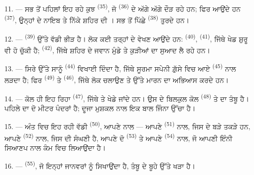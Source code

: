 11. --- ਸਭ ਤੋਂ ਪਹਿਲਾਂ ਇਹ ਰਹੇ ਕੁਝ  \textsuperscript{(35)}, ਜੋ
 \textsuperscript{(36)} ਦੇ ਅੱਗੇ ਅੱਗੇ ਦੌੜ ਰਹੇ ਹਨ; ਫਿਰ ਆਉਂਦੇ
ਹਨ  \textsuperscript{(37)}, ਉਨ੍ਹਾਂ ਦੇ ਨਾਇਬ ਤੇ ਨਿੱਕੇ ਸ਼ਹਿਰ ਦੀ
। ਸਭ ਤੋਂ ਪਿੱਛੇ  \textsuperscript{(38)}
ਤੁਰਦੇ ਹਨ।

\VUsaut{5.0mm}
\VUsaut{3.6mm}

12. ---  \textsuperscript{(39)} ਉੱਤੇ ਵੱਡੀ ਭੀੜ ਹੈ। ਲੋਕ ਕਈ
ਤਰ੍ਹਾਂ ਦੇ  ਵੇਖਣ ਆਉਂਦੇ ਹਨ: 
\textsuperscript{(40)},  \textsuperscript{(41)}, ਜਿੱਥੇ ਖੇਡ ਸ਼ੁਰੂ ਵੀ ਹੋ
ਚੁੱਕੀ ਹੈ;  \textsuperscript{(42)}, ਜਿੱਥੇ ਸ਼ਹਿਰ ਦੇ ਜਵਾਨ ਮੁੰਡੇ
ਤੇ ਕੁੜੀਆਂ  ਦਾ ਸੁਆਦ ਲੈ ਰਹੇ ਹਨ।

13. --- ਸਿਰੇ ਉੱਤੇ ਸਾਨੂੰ  \textsuperscript{(44)} ਵਿਖਾਈ ਦਿੰਦਾ ਹੈ,
ਜਿੱਥੇ ਸੂਰਮਾ ਸਪੇਨੀ  ਗ਼ੁੱਸੇ ਵਿਚ ਆਏ 
\textsuperscript{(45)} ਨਾਲ ਲੜਦਾ ਹੈ; ਫਿਰ  \textsuperscript{(49)}
ਤੇ  \textsuperscript{(46)}, ਜਿੱਥੇ ਲੋਕ
 ਚਲਾਉਣ ਤੇ  ਉੱਤੇ ਮਾਰਨ ਦਾ ਅਭਿਆਸ ਕਰਦੇ ਹਨ।

14. --- ਕੋਲ ਹੀ ਇਹ ਰਿਹਾ  \textsuperscript{(47)}, ਜਿੱਥੇ
 ਤੇ  ਖੇਡੇ ਜਾਂਦੇ ਹਨ। ਉਸ ਦੇ ਬਿਲਕੁਲ ਕੋਲ
 \textsuperscript{(48)} ਤੇ  ਦਾ ਤੰਬੂ ਹੈ। ਪਹਿਲੇ ਦਾ
 ਦੋ ਮੀਟਰ ਪੰਦਰਾਂ ਹੈ; ਦੂਜਾ ਮੁਸ਼ਕਲ ਨਾਲ ਇਕ ਬਾਲ ਜਿੰਨਾ ਉੱਚਾ ਹੈ।

15. --- ਅੰਤ ਵਿਚ ਇਹ ਰਹੀ ਵੱਡੀ  \textsuperscript{(50)},
ਆਪਣੇ  ਨਾਲ — ਆਪਣੇ  \textsuperscript{(51)} ਨਾਲ,
ਜਿਸ ਦੇ  ਬੜੇ ਤਕੜੇ ਹਨ, ਆਪਣੇ  \textsuperscript{(52)}
ਨਾਲ, ਜਿਸ ਦੀ  ਸੰਘਣੀ ਹੈ, ਆਪਣੇ ਦੋ 
\textsuperscript{(53)} ਤੇ ਆਪਣੇ  \textsuperscript{(54)} ਨਾਲ, ਜੋ ਆਪਣੀ
 ਇੰਨੀ ਸਿਆਣਪ ਨਾਲ ਕੰਮ ਵਿਚ ਲਿਆਉਂਦਾ ਹੈ।

16. ---  \textsuperscript{(55)}, ਜੋ ਇਨ੍ਹਾਂ ਜਾਨਵਰਾਂ ਨੂੰ
ਸਿਖਾਉਂਦਾ ਹੈ, ਤੰਬੂ ਦੇ ਬੂਹੇ ਉੱਤੇ ਖੜਾ ਹੈ।
\VUsaut{6.0mm}
\VUfilet{22mm}
